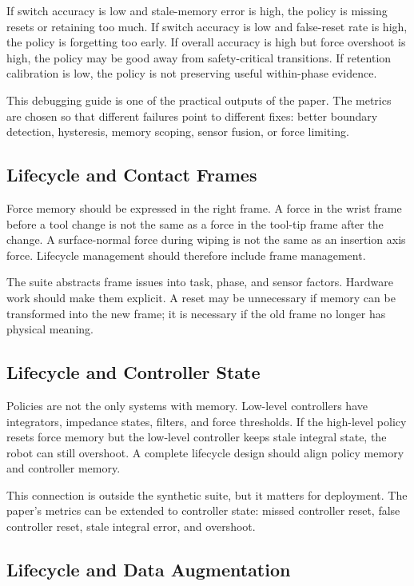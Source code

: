 \documentclass{article}
\begin{document}
If switch accuracy is low and stale-memory error is high, the policy is missing
resets or retaining too much. If switch accuracy is low and false-reset rate is
high, the policy is forgetting too early. If overall accuracy is high but force
overshoot is high, the policy may be good away from safety-critical
transitions. If retention calibration is low, the policy is not preserving
useful within-phase evidence.

This debugging guide is one of the practical outputs of the paper. The metrics
are chosen so that different failures point to different fixes: better boundary
detection, hysteresis, memory scoping, sensor fusion, or force limiting.

\subsection{Lifecycle and Contact Frames}

Force memory should be expressed in the right frame. A force in the wrist frame
before a tool change is not the same as a force in the tool-tip frame after the
change. A surface-normal force during wiping is not the same as an insertion
axis force. Lifecycle management should therefore include frame management.

The suite abstracts frame issues into task, phase, and sensor factors. Hardware
work should make them explicit. A reset may be unnecessary if memory can be
transformed into the new frame; it is necessary if the old frame no longer has
physical meaning.

\subsection{Lifecycle and Controller State}

Policies are not the only systems with memory. Low-level controllers have
integrators, impedance states, filters, and force thresholds. If the high-level
policy resets force memory but the low-level controller keeps stale integral
state, the robot can still overshoot. A complete lifecycle design should align
policy memory and controller memory.

This connection is outside the synthetic suite, but it matters for deployment.
The paper's metrics can be extended to controller state: missed controller
reset, false controller reset, stale integral error, and overshoot.

\subsection{Lifecycle and Data Augmentation}
\end{document}

